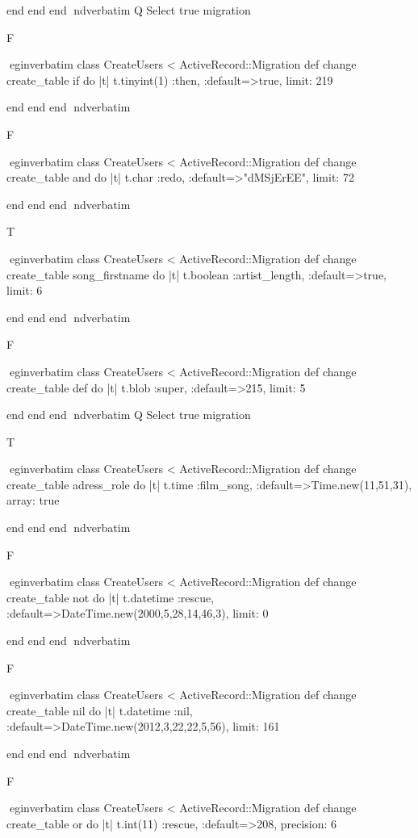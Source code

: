     end 
  end 
end
nd{verbatim}
Q
 Select true migration

F

egin{verbatim}
 class CreateUsers < ActiveRecord::Migration 
  def change 
    create_table if do |t| 
      t.tinyint(1) :then, :default=>true, limit: 219
    
    end 
  end 
end
nd{verbatim}

F

egin{verbatim}
 class CreateUsers < ActiveRecord::Migration 
  def change 
    create_table and do |t| 
      t.char :redo, :default=>"dMSjErEE", limit: 72
    
    end 
  end 
end
nd{verbatim}

T

egin{verbatim}
 class CreateUsers < ActiveRecord::Migration 
  def change 
    create_table song_firstname do |t| 
      t.boolean :artist_length, :default=>true, limit: 6
    
    end 
  end 
end
nd{verbatim}

F

egin{verbatim}
 class CreateUsers < ActiveRecord::Migration 
  def change 
    create_table def do |t| 
      t.blob :super, :default=>215, limit: 5
    
    end 
  end 
end
nd{verbatim}
Q
 Select true migration

T

egin{verbatim}
 class CreateUsers < ActiveRecord::Migration 
  def change 
    create_table adress_role do |t| 
      t.time :film_song, :default=>Time.new(11,51,31), array: true
    
    end 
  end 
end
nd{verbatim}

F

egin{verbatim}
 class CreateUsers < ActiveRecord::Migration 
  def change 
    create_table not do |t| 
      t.datetime :rescue, :default=>DateTime.new(2000,5,28,14,46,3), limit: 0
    
    end 
  end 
end
nd{verbatim}

F

egin{verbatim}
 class CreateUsers < ActiveRecord::Migration 
  def change 
    create_table nil do |t| 
      t.datetime :nil, :default=>DateTime.new(2012,3,22,22,5,56), limit: 161
    
    end 
  end 
end
nd{verbatim}

F

egin{verbatim}
 class CreateUsers < ActiveRecord::Migration 
  def change 
    create_table or do |t| 
      t.int(11) :rescue, :default=>208, precision: 6
    
